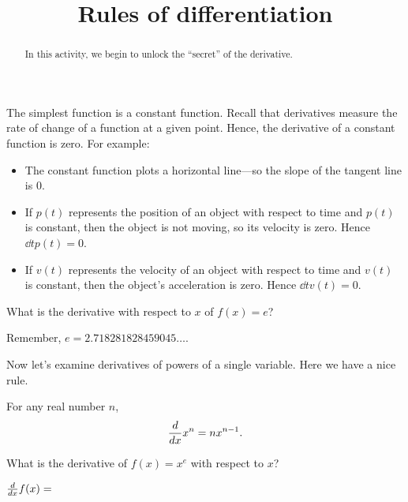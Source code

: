 \documentclass{ximera}
\title{Rules of differentiation}
\begin{document}
\begin{abstract}
  In this activity, we begin to unlock the ``secret'' of the derivative. 
\end{abstract}
\maketitle


The simplest function is a constant function.  Recall that derivatives
measure the rate of change of a function at a given point. Hence, the
derivative of a constant function is zero. For example:
\begin{itemize}
\item The constant function plots a horizontal line---so the slope of
  the tangent line is $0$.
\item If $p(t)$ represents the position of an object with respect to
  time and $p(t)$ is constant, then the object is not moving, so its
  velocity is zero. Hence $\dd{t} p(t) = 0$.
\item If $v(t)$ represents the velocity of an object with respect to
  time and $v(t)$ is constant, then the object's acceleration is
  zero. Hence $\dd{t} v(t) = 0$.
\end{itemize}


\begin{question}
  What is the derivative with respect to $x$ of $f(x) = e$? 
\begin{hint}
Remember, $e=2.718281828459045\dots$.
\end{hint}
    \begin{multipleChoice}
    \end{multipleChoice}  
\end{question}

Now let's examine derivatives of powers of a single variable.  Here we
have a nice rule.

\begin{theorem}
For any real number $n$, 
\[
\frac{d}{dx} x^n = n x^{n-1}.
\]
\end{theorem}

\begin{question}
  What is the derivative of $f(x) = x^e$ with respect to $x$?
\begin{prompt}
$\frac{d}{dx} f(x) = $
\end{prompt}
\end{question}
\end{document}
